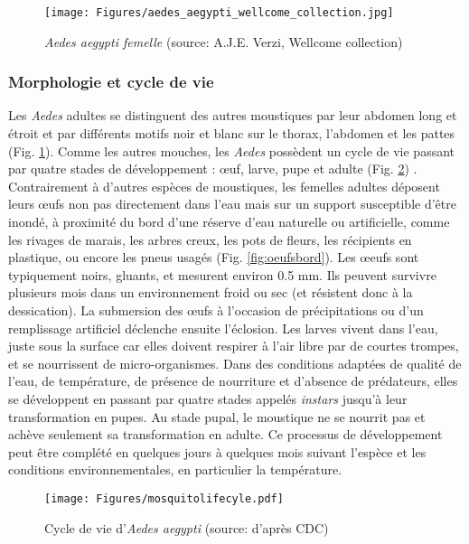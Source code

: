 \begin{figure}[t]
	\centering
	\texttt{[image: Figures/aedes\_aegypti\_wellcome\_collection.jpg]}
	\caption{{\em Aedes aegypti femelle} (source: A.J.E. Verzi, Wellcome collection)}
	\label{fig:aedesvexans}
\end{figure}

\subsubsection{Morphologie et cycle de vie}
Les {\em Aedes} adultes se distinguent des autres moustiques par leur abdomen long et étroit et par différents motifs noir et blanc sur le thorax, l'abdomen et les pattes (Fig. \ref{fig:aedesvexans}).
Comme les autres mouches, les {\em Aedes} possèdent un cycle de vie passant par quatre stades de développement : \oe uf, larve, pupe et adulte (Fig. \ref{fig:mosquitolifecyle}) \cite{christophers1960aedes}.
Contrairement à d'autres espèces de moustiques, les femelles adultes déposent leurs \oe ufs non pas directement dans l'eau mais sur un support susceptible d'être inondé, à proximité du bord d'une réserve d'eau naturelle ou artificielle, comme les rivages de marais, les arbres creux, les pots de fleurs, les récipients en plastique, ou encore les pneus usagés (Fig. \ref{fig:oeufsbord}).
Les \oe eufs sont typiquement noirs, gluants, et mesurent environ 0.5 mm.
Ils peuvent survivre plusieurs mois dans un environnement froid ou sec (et résistent donc à la dessication).
La submersion des \oe ufs à l'occasion de précipitations ou d'un remplissage artificiel déclenche ensuite l'éclosion.
Les larves vivent dans l'eau, juste sous la surface car elles doivent respirer à l'air libre par de courtes trompes, et se nourrissent de micro-organismes. 
Dans des conditions adaptées de qualité de l'eau, de température, de présence de nourriture et d'absence de prédateurs, elles se développent en passant par quatre stades appelés {\em instars} jusqu'à leur transformation en pupes.
Au stade pupal, le moustique ne se nourrit pas et achève seulement sa transformation en adulte.
Ce processus de développement peut être complété en quelques jours à quelques mois suivant l'espèce et les conditions environnementales, en particulier la température.


\begin{figure}[h]
	\centering
	\texttt{[image: Figures/mosquitolifecyle.pdf]}
	\caption{Cycle de vie d'{\em Aedes aegypti} (source: d'après CDC)}
	\label{fig:mosquitolifecyle}
\end{figure}

